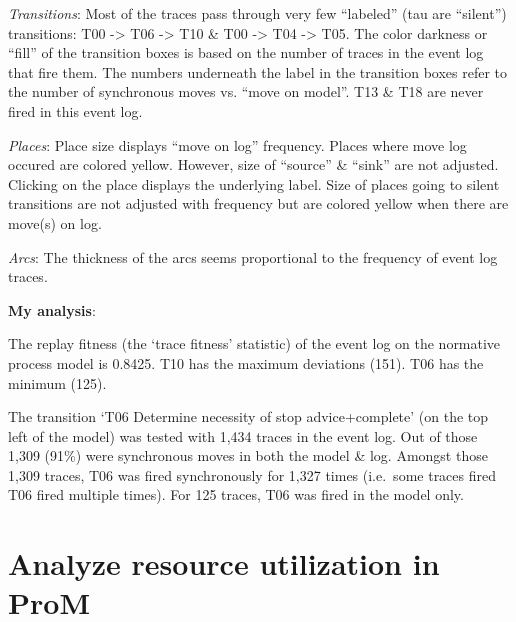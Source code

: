 \documentclass[]{article}
\begin{document}
\emph{Transitions}: Most of the traces pass through very few ``labeled''
(tau are ``silent'') transitions: T00 -\textgreater{} T06
-\textgreater{} T10 \& T00 -\textgreater{} T04 -\textgreater{} T05. The
color darkness or ``fill'' of the transition boxes is based on the
number of traces in the event log that fire them. The numbers underneath
the label in the transition boxes refer to the number of synchronous
moves vs. ``move on model''. T13 \& T18 are never fired in this event
log.

\emph{Places}: Place size displays ``move on log'' frequency. Places
where move log occured are colored yellow. However, size of ``source''
\& ``sink'' are not adjusted. Clicking on the place displays the
underlying label. Size of places going to silent transitions are not
adjusted with frequency but are colored yellow when there are move(s) on
log.

\emph{Arcs}: The thickness of the arcs seems proportional to the
frequency of event log traces.

\textbf{My analysis}:

The replay fitness (the `trace fitness' statistic) of the event log on
the normative process model is 0.8425. T10 has the maximum deviations
(151). T06 has the minimum (125).

The transition `T06 Determine necessity of stop advice+complete' (on the
top left of the model) was tested with 1,434 traces in the event log.
Out of those 1,309 (91\%) were synchronous moves in both the model \&
log. Amongst those 1,309 traces, T06 was fired synchronously for 1,327
times (i.e.~some traces fired T06 fired multiple times). For 125 traces,
T06 was fired in the model only.

\section{Analyze resource utilization in
ProM}\label{analyze-resource-utilization-in-prom}
\end{document}
